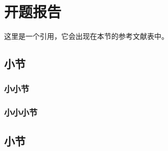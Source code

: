 \section{开题报告}

这里是一个引用\citep{exampleReference}，它会出现在本节的参考文献表中。

\subsection{小节}
\lipsum[3]

\subsubsection{小小节}
\lipsum[3]

\subsubsection{小小小节}
\lipsum[4]

\lipsum[7]

\subsection{小节}
\lipsum[8]
